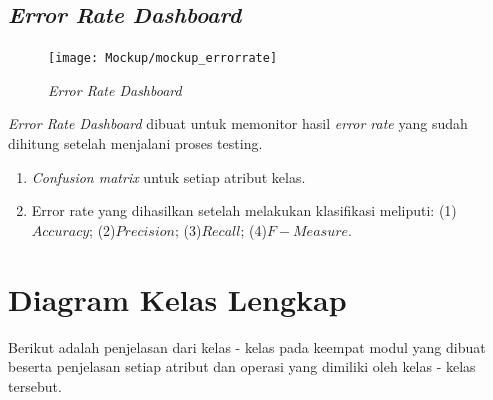 \subsection{\textit{Error Rate Dashboard}}
\label{subsec:Error Rate Dashboard}

\begin{figure}[H]
	\centering
	\texttt{[image: Mockup/mockup\_errorrate]}
	\caption[\textit{Error Rate Dashboard}]{\textit{Error Rate Dashboard}}
	\label{fig:Error Rate Dashboard}
\end{figure}
\textit{Error Rate Dashboard} dibuat untuk memonitor hasil \textit{error rate} yang sudah dihitung setelah menjalani proses testing. 
\begin{enumerate}
	\item \textit{Confusion matrix} untuk setiap atribut kelas.
	\item Error rate yang dihasilkan setelah melakukan klasifikasi meliputi: (1)$Accuracy$; (2)$Precision$; (3)$Recall$; (4)$F-Measure$.
\end{enumerate}



\section{Diagram Kelas Lengkap}
Berikut adalah penjelasan dari kelas - kelas pada keempat modul yang dibuat beserta penjelasan setiap atribut dan operasi yang dimiliki oleh kelas - kelas tersebut.

